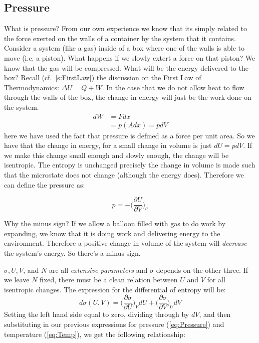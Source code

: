 \subsection{Pressure}
What is pressure? From our own experience we know that its simply related to the force exerted on the walls of a container by the system that it contains. Consider a system (like a gas) inside of a box where one of the walls is able to move (i.e. a piston). What happens if we slowly extert a force on that piston? We know that the gas will be compressed. What will be the energy delivered to the box? 
Recall (cf.~\ref{s:FirstLaw}) the discussion on the First Law of 
Thermodynamics: $\Delta U = Q + W$. In the case that we do not allow heat to flow through the walls of the box, the change in energy will just be the work done on the system.
\begin{align}
dW &= F dx \\
   &= p (A dx) = p dV
\end{align}
here we have used the fact that pressure is defined as a force per unit area.
So we have that the change in energy, for a small change in volume is just
$dU = p dV$. If we make this change small enough and slowly enough, the change will be isentropic. The entropy is unchanged precisely the change in volume is made such that the microstate does not change (although the energy does).
Therefore we can define the pressure as:

\begin{equation}
p = -\bigg(\frac{\partial U}{\partial V}\bigg)_{\sigma}
\label{eq:Pressure}
\end{equation}

Why the minus sign? If we allow a balloon filled with gas to do work by expanding, we know that it is doing work and delivering energy to the environment. Therefore a positive change in volume of the system will \textit{decrease} the system's energy. So there's a minus sign.

$\sigma, U, V$, and $N$ are all \textit{extensive parameters} and $\sigma$ depends on the other three. If we leave $N$ fixed, there must be a clean relation between
$U$ and $V$ for all isentropic changes. The expression for the differential of
entropy will be:
\begin{equation}
d\sigma(U, V) = \bigg(\frac{\partial \sigma}{\partial U}\bigg)_{V} dU +
	            \bigg(\frac{\partial \sigma}{\partial V}\bigg)_{U} dV
\end{equation}
Setting the left hand side equal to zero, dividing through by $dV$, and then substituting in our previous expressions for pressure (\cref{eq:Pressure})
and temperature (\cref{eq:Temp}), we get the following relationship:

